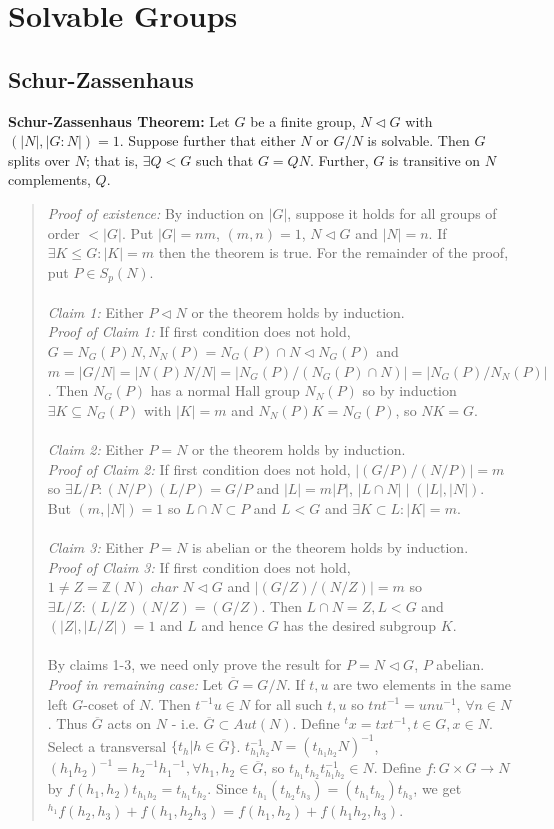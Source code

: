 \chapter{Solvable Groups}
\section {Schur-Zassenhaus}
{\bf Schur-Zassenhaus Theorem:} Let $G$ be a finite group,
$N \lhd G$ with $(|N|, |G:N|)=1$.  Suppose further
that either $N$ or $G/N$ is
solvable. Then $G$ splits over $N$; that is,
$\exists Q < G$ such that $G= QN$.
Further, $G$ is transitive on $N$ complements, $Q$.
\begin{quote}
\emph {Proof of existence:}
By induction on $|G|$, suppose it holds for all groups of order $<|G|$. Put $|G|=nm$,
$(m,n)=1$, $N \lhd G$ and $|N|= n$.  If $\exists K \le G: |K|=m$ then the theorem is true.
For the remainder of the proof, put $P \in S_p(N)$.  
\\
\\
\emph{Claim 1:} Either $P \lhd N$ or the theorem holds by induction.
\\
\emph{Proof of Claim 1:} 
If first condition does not hold,
$G=N_G(P)N, N_N(P)=N_G(P) \cap N \lhd N_G(P)$ and 
$m=|G/N|=|N(P)N/N|=|N_G (P)/(N_G (P) \cap N)|= |N_G(P)/N_N(P)|$.
Then $N_G(P)$ has a
normal Hall group $N_N(P)$ so by induction $\exists K \subseteq N_G(P)$ with
$|K|=m$ and $N_N(P)K=N_G(P)$, so $NK=G$. 
\\
\\
\emph{Claim 2:} Either $P = N$ or the theorem holds by induction.
\\
\emph{Proof of Claim 2:} 
If first condition does not hold,
$|(G/P)/(N/P)|=m$ so $\exists L/P: (N/P)(L/P)= G/P$ and 
$|L|=m |P|$, $|L \cap N| \mid (|L|, |N|)$.
But $(m, |N|)=1$ so $L \cap N \subset P$ and $L<G$ and $\exists K \subset L: |K|=m$.
\\
\\
\emph{Claim 3:} Either $P = N$ is abelian or the theorem holds by induction.
\\
\emph{Proof of Claim 3:} 
If first condition does not hold,
$1 \ne Z= {\mathbb Z}(N) \; char \; N \lhd G$ and
$|(G/Z)/(N/Z)|=m$ so $\exists L/Z: (L/Z)(N/Z)=(G/Z)$. Then $L \cap N =Z, L < G$ and
$(|Z|, |L/Z|)=1$ and $L$ and hence $G$ has the desired subgroup $K$.
\\
\\
By claims 1-3, we need only prove the result for $P=N \lhd G$, $P$ abelian.
\\
\emph{Proof in remaining case:} 
Let $\overline{G}= G/N$.  If $t, u$ are two elements in
the same left $G$-coset of $N$.
Then $t^{-1}u \in N$ for all such $t, u$
so $tnt^{-1}=unu^{-1}$, $\forall n \in N$.
Thus $\overline{G}$ acts on $N$ - i.e. $\overline{G} \subset Aut(N)$.
Define $^tx=txt^{-1}, t \in G, x \in N$.
Select a transversal $\{t_{h} | h \in \overline{G}\}$.
$t^{-1}_{h_1 h_2}N = (t_{h_1h_2}N)^{-1}$,
$(h_1h_2)^{-1} = {h_2}^{-1}{h_1}^{-1}, \forall h_1 , h_2 \in \overline{G}$, so 
$t_{h_1}t_{h_2} t^{-1}_{h_1 h_2} \in N$.
Define $f: G \times G \rightarrow N$ by
$f(h_1, h_2) t_{h_1 h_2} = t_{h_1} t_{h_2}$.  Since
$t_{h_1}(t_{h_2} t_{h_3}) = (t_{h_1}t_{h_2}) t_{h_3}$, we get
$ {^{h_1}} f(h_2, h_3)+ f(h_1, h_2 h_3)= f(h_1, h_2)+ f(h_1 h_2 , h_3)$.


\end{quote}
